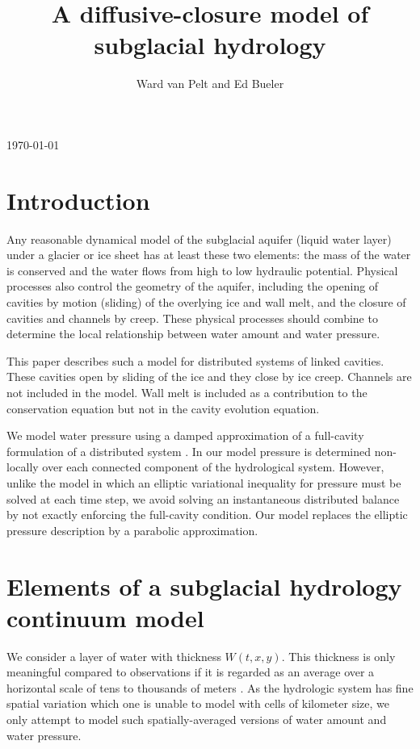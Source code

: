 \documentclass[11pt,final]{amsart}%
\title[]{A diffusive-closure model of subglacial hydrology}
\author[]{Ward van Pelt and Ed Bueler}
\begin{document}
\scriptsize \hfill \today \normalsize
\vspace{0.5in}

\maketitle
\thispagestyle{empty}

\section{Introduction}

Any reasonable dynamical model of the subglacial aquifer (liquid water layer) under a glacier or ice sheet has at least these two elements: the mass of the water is conserved and the water flows from high to low hydraulic potential.  Physical processes also control the geometry of the aquifer, including the opening of cavities by motion (sliding) of the overlying ice and wall melt, and the closure of cavities and channels by creep.  These physical processes should combine to determine the local relationship between water amount and water pressure.  

This paper describes such a model for distributed systems of linked cavities.  These cavities open by sliding of the ice and they close by ice creep.  Channels are not included in the model.  Wall melt is included as a contribution to the conservation equation but not in the cavity evolution equation.

We model water pressure using a damped approximation of a full-cavity formulation of a distributed system \cite{Schoofetal2012}.  In our model pressure is determined non-locally over each connected component of the hydrological system.  However, unlike the \cite{Schoofetal2012} model in which an elliptic variational inequality for pressure must be solved at each time step, we avoid solving an instantaneous distributed balance by not exactly enforcing the full-cavity condition.  Our model replaces the elliptic pressure description by a parabolic approximation.


\section{Elements of a subglacial hydrology continuum model}

We consider a layer of water with thickness $W(t,x,y)$.  This thickness is only meaningful compared to observations if it is regarded as an average over a horizontal scale of tens to thousands of meters \citep{FlowersClarke2002_theory}.  As the hydrologic system has fine spatial variation which one is unable to model with cells of kilometer size, we only attempt to model such spatially-averaged versions of water amount and water pressure.
\end{document}
